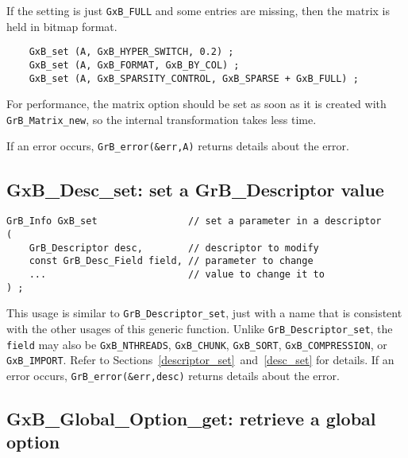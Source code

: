 \documentclass[12pt]{article}
\begin{document}
{If the setting is just \verb'GxB_FULL' and some entries are missing, then
the matrix is held in bitmap format.

{\footnotesize
\begin{verbatim}
    GxB_set (A, GxB_HYPER_SWITCH, 0.2) ;
    GxB_set (A, GxB_FORMAT, GxB_BY_COL) ;
    GxB_set (A, GxB_SPARSITY_CONTROL, GxB_SPARSE + GxB_FULL) ;
\end{verbatim} }

For performance, the matrix option should be set as soon as it is created with
\verb'GrB_Matrix_new', so the internal transformation takes less time.

If an error occurs, \verb'GrB_error(&err,A)' returns details about the error.

\subsection{{\sf GxB\_Desc\_set:} set a {\sf GrB\_Descriptor} value}
\label{gxbset}

\begin{mdframed}[userdefinedwidth=6in]
{\footnotesize
\begin{verbatim}
GrB_Info GxB_set                // set a parameter in a descriptor
(
    GrB_Descriptor desc,        // descriptor to modify
    const GrB_Desc_Field field, // parameter to change
    ...                         // value to change it to
) ;
\end{verbatim} } \end{mdframed}

This usage is similar to \verb'GrB_Descriptor_set', just with a name that is
consistent with the other usages of this generic function.  Unlike
\verb'GrB_Descriptor_set', the \verb'field' may also be \verb'GxB_NTHREADS',
\verb'GxB_CHUNK', \verb'GxB_SORT', \verb'GxB_COMPRESSION', or
\verb'GxB_IMPORT'.  Refer to Sections~\ref{descriptor_set}~and~\ref{desc_set}
for details.  If an error occurs, \verb'GrB_error(&err,desc)' returns details
about the error.

\newpage
\subsection{{\sf GxB\_Global\_Option\_get:} retrieve a global option}
\label{gxbget}

}
\end{document}
